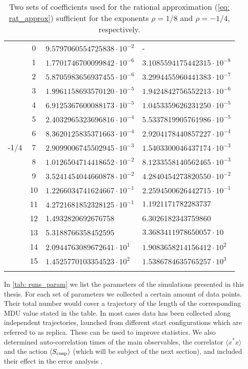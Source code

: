 \begin{longtable}{ccll}
\midrule
  & 0 & $9.5797060554725838\cdot 10^{-2}$ & \hspace{2cm}- \\ 
  & 1 & $1.7701746700099842\cdot 10^{-6}$ & $3.1085594175442315\cdot 10^{-8}$ \\ 
  & 2 & $5.8705983656937455\cdot 10^{-6}$ & $3.2994455960441383\cdot 10^{-7}$ \\ 
  & 3 & $1.9961158693570120\cdot 10^{-5}$ & $1.9424842756552213\cdot 10^{-6}$ \\ 
  & 4 & $6.9125367600088173\cdot 10^{-5}$ & $1.0453359626231250\cdot 10^{-5}$ \\ 
  & 5 & $2.4032965323696816\cdot 10^{-4}$ & $5.5337819905761986\cdot 10^{-5}$ \\ 
  & 6 & $8.3620125835371663\cdot 10^{-4}$ & $2.9204178440857227\cdot 10^{-4}$ \\ 
-1/4  & 7 & $2.9099006745502945\cdot 10^{-3}$  & $1.5403300046437174\cdot 10^{-3}$ \\ 
  & 8 & $1.0126504714418652\cdot 10^{-2}$ & $8.1233558140562465\cdot 10^{-3}$ \\ 
  & 9 & $3.5241454044660878\cdot 10^{-2}$ & $4.2840454273820550\cdot 10^{-2}$ \\ 
  & 10 & $1.2266034741624667\cdot 10^{-1}$ & $2.2594500626442715\cdot 10^{-1}$ \\ 
  & 11 & $4.2721681852328125\cdot 10^{-1}$ & $1.1921171782283737$ \\ 
  & 12 & 1.4932820692676758 & 6.3026182343759860 \\ 
  & 13 & 5.3188766358452595 & $3.3683411978650057\cdot 10$ \\ 
  & 14 & $2.0944763089672641\cdot 10^{1}$ & $1.9083658214156412\cdot 10^{2}$ \\ 
  & 15 & $1.4525770103354523\cdot 10^{2}$ & $1.5386784635765257\cdot 10^{3}$ \\ 
\bottomrule
\caption{Two sets of coefficients used for the rational approximation (\ref{eq: rat_approx}) sufficient for the exponents $\rho = 1/8$ and $\rho=-1/4$, respectively. \label{tab: rat_app_coef}}
\end{longtable} 
%
%
In \autoref{tab: runs_param} we list the parameters of the simulations presented in this thesis. For each set of parameters we collected a certain amount of data points. Their total number would cover a trajectory of the length of the corresponding MDU value stated in the table. In most cases data has been collected along independent trajectories, launched from different start configurations which are referred to as replica. These can be used to improve statistics. We also determined auto-correlation times of the main observables, the correlator $\langle x^{*}x\rangle$ and the action $\langle S_{\rm cusp} \rangle$ (which will be subject of the next section), and included their effect in the error analysis \cite{Wolff:2003sm}.

